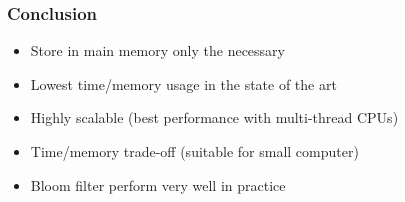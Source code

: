 \begin{frame}
	\frametitle{Conclusion}
	\centering

  \begin{itemize}
    \item Store in main memory only the necessary
    \item Lowest time/memory usage in the state of the art
    \item Highly scalable (best performance with multi-thread CPUs)
    \item Time/memory trade-off (suitable for small computer)
    \item Bloom filter perform very well in practice
  \end{itemize}

\end{frame}
